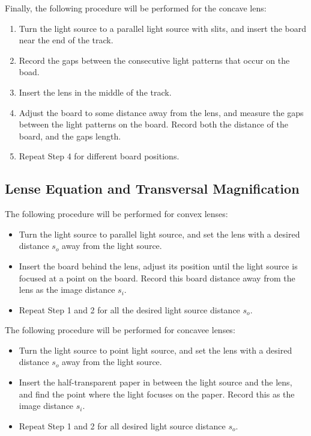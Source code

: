 \documentclass{article}
\begin{document}
\hfil

Finally, the following procedure will be performed for the concave lens:
\begin{enumerate}
    \item Turn the light source to a parallel light source with slits, and insert the board near the end of the track.
    \item Record the gaps between the consecutive light patterns that occur on the boad.
    \item Insert the lens in the middle of the track.
    \item Adjust the board to some distance away from the lens, and measure the gaps between the light patterns on the board. Record both the distance of the board, and the gaps length.
    \item Repeat Step 4 for different board positions.
\end{enumerate}

\hfil

\subsection{Lense Equation and Transversal Magnification}
The following procedure will be performed for convex lenses:
\begin{itemize}
    \item Turn the light source to parallel light source, and set the lens with a desired distance $s_o$ away from the light source.
    \item Insert the board behind the lens, adjust its position until the light source is focused at a point on the board. Record this board distance away from the lens as the image distance $s_i$.
    \item Repeat Step 1 and 2 for all the desired light source distance $s_o$.
\end{itemize}

\hfil

The following procedure will be performed for concavee lenses:
\begin{itemize}
    \item Turn the light source to point light source, and set the lens with a desired distance $s_o$ away from the light source.
    \item Insert the half-transparent paper in between the light source and the lens, and find the point where the light focuses on the paper. Record this as the image distance $s_i$.
    \item Repeat Step 1 and 2 for all desired light source distance $s_o$.
\end{itemize}
\end{document}
